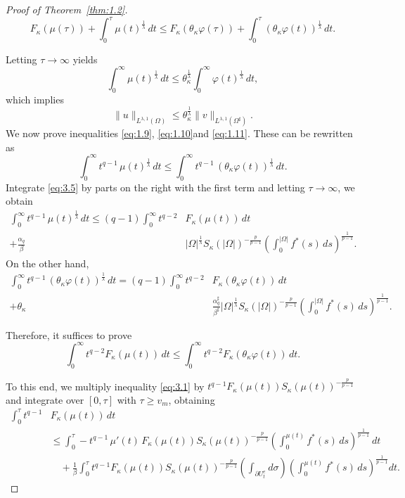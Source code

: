 \documentclass[11pt]{article}
\numberwithin{equation}{section}
\theoremstyle{definition}
\theoremstyle{remark}
\begin{document}
\begin{proof}[Proof of Theorem~\ref{thm:1.2}]
\[
F_\kappa(\mu(\tau)) + \int_0^\tau \mu(t)^{\frac{1}{\lambda}}\,dt
\le
F_\kappa(\theta_\kappa\varphi(\tau)) + \int_0^\tau (\theta_\kappa\varphi(t))^{\frac{1}{\lambda}}\,dt.
\]

Letting $\tau\to\infty$ yields
\[
\int_0^\infty \mu(t)^{\frac{1}{\lambda}}\,dt
\le
\theta_\kappa^{\frac{1}{\lambda}}
\int_0^\infty \varphi(t)^{\frac{1}{\lambda}}\,dt,
\]
which implies
\[
\|u\|_{L^{\lambda,1}(\Omega)}
\le
\theta_\kappa^{\frac{1}{\lambda}}
\|v\|_{L^{\lambda,1}(\Omega^\sharp)}.
\]
We now prove inequalities \eqref{eq:1.9}, \eqref{eq:1.10}and \eqref{eq:1.11}. These can be rewritten as
\[
\int_0^\infty t^{q-1}\,\mu(t)^{\frac{1}{\lambda}}\,dt
\le
\int_0^\infty t^{q-1}\,(\theta_\kappa \varphi(t))^{\frac{1}{\lambda}}\,dt.
\]
\noindent
Integrate \eqref{eq:3.5} by parts on the right with the first term and letting $\tau\to\infty$, we obtain
\begin{align*}
\int_0^\infty t^{q-1}\,\mu(t)^{\frac{1}{\lambda}}\,dt
\le
(q-1)
\int_0^\infty t^{q-2} &F_\kappa(\mu(t))\,dt
\\+\frac{\alpha_q}{\beta}&
|\Omega|^{\frac{1}{\lambda}}S_\kappa(|\Omega|)^{-\frac{p}{p-1}}
\left(\int_0^{|\Omega|} f^*(s)\,ds\right)^{\frac{1}{p-1}}.
\end{align*}
\noindent
On the other hand,
\begin{align*}
\int_0^\infty t^{q-1}\,(\theta_\kappa \varphi(t))^{\frac{1}{\lambda}}\,dt
=
(q-1)
\int_0^\infty t^{q-2}&F_\kappa(\theta_\kappa \varphi(t))\,dt
\\+
\theta_\kappa &\frac{\alpha_q^\sharp}{\beta^\sharp}
|\Omega|^{\frac{1}{\lambda}}S_\kappa(|\Omega|)^{-\frac{p}{p-1}}
\left(\int_0^{|\Omega|} f^*(s)\,ds\right)^{\frac{1}{p-1}}.
\end{align*}

Therefore, it suffices to prove
\[
\int_0^\infty t^{q-2}F_\kappa(\mu(t))\,dt
\le
\int_0^\infty t^{q-2}F_\kappa(\theta_\kappa \varphi(t))\,dt.
\]

To this end, we multiply inequality \eqref{eq:3.1} by
$t^{q-1} F_\kappa(\mu(t)) S_\kappa(\mu(t))^{-\frac{p}{p-1}}$ and integrate over $[0,\tau]$ with $\tau \ge v_m$, obtaining
\begin{align*}
\int_0^\tau t^{q-1} &F_\kappa(\mu(t))\,dt\\
&\le
\int_0^\tau
-t^{q-1}\,\mu'(t)\,F_\kappa(\mu(t))S_\kappa(\mu(t))^{-\frac{p}{p-1}}
\left(\int_0^{\mu(t)} f^*(s)\,ds\right)^\frac{1}{p-1}\,dt
\\
&\quad
+\frac{1}{\beta}
\int_0^\tau
t^{q-1} F_\kappa(\mu(t))S_\kappa(\mu(t))^{-\frac{p}{p-1}}
\left(\int_{\partial U_t^e} d\sigma\right)
\left(\int_0^{\mu(t)} f^*(s)\,ds\right) ^\frac{1}{p-1}dt.
\end{align*}


\end{proof}
\end{document}
